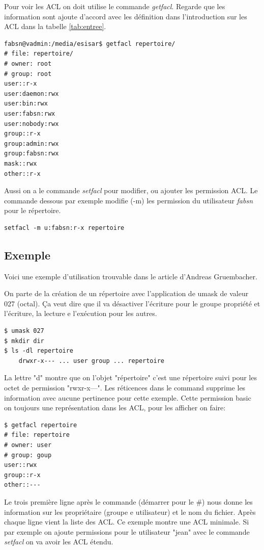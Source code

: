 Pour voir les ACL on doit utilise le commande \emph{getfacl}. Regarde que les information sont ajoute d'accord avec les définition dans l'introduction sur les ACL dans la tabelle \ref{tab:entree}. 

\begin{verbatim}
fabsn@vadmin:/media/esisar$ getfacl repertoire/
# file: repertoire/
# owner: root
# group: root
user::r-x
user:daemon:rwx
user:bin:rwx
user:fabsn:rwx
user:nobody:rwx
group::r-x
group:admin:rwx
group:fabsn:rwx
mask::rwx
other::r-x	
\end{verbatim}

Aussi on a le commande \emph{setfacl} pour modifier, ou ajouter les permission ACL. Le commande dessous par exemple modifie (-m) les permission du utilisateur \emph{fabsn} pour le répertoire. 

\begin{verbatim}
setfacl -m u:fabsn:r-x repertoire
\end{verbatim}

\subsection*{Exemple}

Voici une exemple d'utilisation trouvable dans le article d'Andreas Gruembacher\cite{aclsuse}.

On parte de la création de un répertoire avec l'application de umask de valeur 027 (octal). Ça veut dire que il va   désactiver l'écriture pour le groupe propriété et l'écriture, la lecture e l'exécution pour les autres.

\begin{verbatim}
$ umask 027 
$ mkdir dir 
$ ls -dl repertoire
	drwxr-x--- ... user group ... repertoire
\end{verbatim}

La lettre "d" montre que on l'objet "répertoire" c'est une répertoire suivi pour les octet de permission "rwxr-x---". Les réticences dans le command supprime les information avec aucune pertinence pour cette exemple. Cette permission basic on toujours une représentation dans les ACL, pour les afficher on faire:

\begin{verbatim}
$ getfacl repertoire
# file: repertoire 
# owner: user 
# group: goup
user::rwx
group::r-x
other::---
\end{verbatim}

Le trois première ligne après le commande (démarrer pour le \#) nous donne les information sur les propriétaire (groupe e utilisateur) et le nom du fichier. Après chaque ligne vient la liste des ACL. Ce exemple montre une ACL minimale. Si par exemple on ajoute permissions pour le utilisateur "jean" avec le commande \emph{setfacl} on va avoir les ACL étendu.

